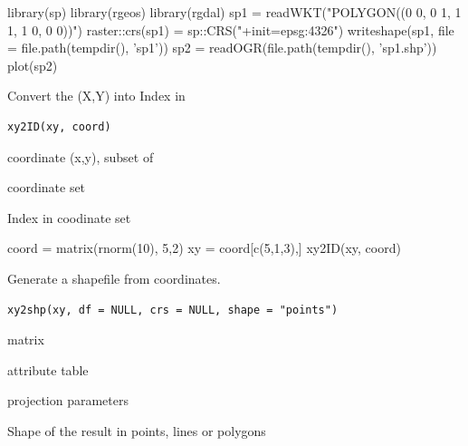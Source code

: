 \documentclass[a4paper]{book}
\begin{document}
%
\begin{Examples}
\begin{ExampleCode}
library(sp)
library(rgeos)
library(rgdal)
sp1 = readWKT("POLYGON((0 0, 0 1, 1 1, 1 0, 0 0))")
raster::crs(sp1) = sp::CRS("+init=epsg:4326")
writeshape(sp1, file = file.path(tempdir(), 'sp1'))
sp2 = readOGR(file.path(tempdir(), 'sp1.shp'))
plot(sp2)
\end{ExampleCode}
\end{Examples}
%
\begin{Description}\relax
Convert the  (X,Y) into Index in 
\end{Description}
%
\begin{Usage}
\begin{verbatim}
xy2ID(xy, coord)
\end{verbatim}
\end{Usage}
%
\begin{Arguments}
\begin{ldescription}
\item[\code{xy}] coordinate (x,y), subset of 

\item[\code{coord}] coordinate set
\end{ldescription}
\end{Arguments}
%
\begin{Value}
Index in coodinate set
\end{Value}
%
\begin{Examples}
\begin{ExampleCode}
coord = matrix(rnorm(10), 5,2)
xy = coord[c(5,1,3),]
xy2ID(xy, coord)
\end{ExampleCode}
\end{Examples}
%
\begin{Description}\relax
Generate a shapefile from coordinates.
\end{Description}
%
\begin{Usage}
\begin{verbatim}
xy2shp(xy, df = NULL, crs = NULL, shape = "points")
\end{verbatim}
\end{Usage}
%
\begin{Arguments}
\begin{ldescription}
\item[\code{xy}] matrix

\item[\code{df}] attribute table

\item[\code{crs}] projection parameters

\item[\code{shape}] Shape of the result in points, lines or polygons
\end{ldescription}
\end{Arguments}
\end{document}

